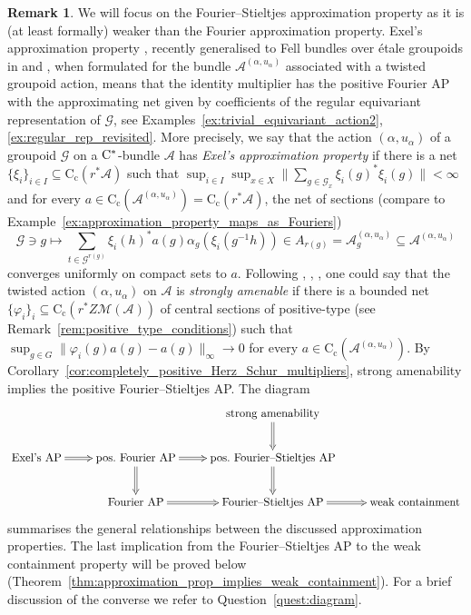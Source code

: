 \documentclass[11 pt, leqno]{amsart}
\numberwithin{equation}{section}
\theoremstyle{plain}
\theoremstyle{definition}
\newtheorem {rem} [thm]{Remark}
\newcommand*{\contc}{\mathrm{C_c}}%
\newcommand{\M}{\mathcal M}
\newcommand{\G}{\mathcal G} %
\newcommand{\A}{\mathcal A}
\newcommand{\cst}{\ifmmode\mathrm{C}^*\else{$\mathrm{C}^*$}\fi}
\begin{document}
\begin{rem} \label{rem:diagram}  
We will focus on the Fourier--Stieltjes approximation property as it is (at least formally) weaker than the Fourier approximation property. 
Exel's approximation property \cite[Definition~4.4]{Exel:amenability}, recently generalised to Fell bundles over \'etale groupoids in \cite[Definition~3.1]{Kranz} and \cite[Definition~4.10]{BussMartinez}, when formulated for the bundle $\A^{(\alpha,u_{\alpha})}$ associated with a twisted groupoid action, means that the identity multiplier has the positive Fourier AP with the approximating net given by  coefficients of the regular equivariant representation of $\G$, see Examples~\ref{ex:trivial_equivariant_action2}, \ref{ex:regular_rep_revisited}. 
More precisely, we say that the action $(\alpha,u_{\alpha})$ of a groupoid $\G$ on a $\cst$-bundle $\A$ has \emph{Exel's approximation property} if there is a net $\{\xi_{i}\}_{i\in I}\subseteq \contc(r^*\A)$ such that $\sup_{i\in I} \sup_{x\in X} \| \sum_{g\in \G_x}\xi_i(g)^*\xi_i(g) \| <\infty$ and for every $a\in\contc(\A^{(\alpha,u_{\alpha})})=\contc(r^*\A)$, the net of sections (compare to Example~\ref{ex:approximation_property_maps_as_Fouriers})
\[
    \G\ni g\longmapsto \sum_{t\in \G^{r(g)}} \xi_i(h)^* a(g)\alpha_{g}(\xi_i(g^{-1}h)) \in A_{r(g)} = \A^{(\alpha,u_{\alpha})}_g \subseteq \A^{(\alpha,u_{\alpha})}
\]
converges uniformly on compact sets to $a$. 
Following \cite[Definition 3.5]{BussEchterhoffWillett}, \cite[Definition 2.2]{Takeishi}, \cite[Theorem 5.6.18]{BO}, one could say that the twisted action $(\alpha,u_{\alpha})$ on $\A$ is \emph{strongly amenable} if there is a bounded net $\{\varphi_i\}_{i}\subseteq \contc(r^*Z\M(\A))$ of central sections of positive-type (see Remark~\ref{rem:positive_type_conditions}) such that $\sup_{g\in G} \|\varphi_i(g)a(g) - a(g)\|_{\infty}\longrightarrow 0$ for every $a \in \contc(\A^{(\alpha,u_{\alpha})})$. 
By Corollary~\ref{cor:completely_positive_Herz_Schur_multipliers}, strong amenability implies the  positive Fourier--Stieltjes AP.
The diagram 
\small
\[
    \xymatrix{
   &  & \text{strong amenability} \ar@{=>}[d]  & \\ 
    \text{Exel's AP} \ar@{=>}[r]  & \text{pos.\ Fourier AP} \ar@{=>}[r] \ar@{=>}[d]  & \text{pos.\ Fourier--Stieltjes AP}\ar@{=>}[d] & \\ 
    &  \text{Fourier AP} \ar@{=>}[r]  & \text{Fourier--Stieltjes AP} \ar@{=>}[r] & \text{weak containment} 
}
\] 
\normalsize
summarises the general relationships between the discussed approximation properties. 
The last implication from the Fourier--Stieltjes AP to the weak containment property will be proved below (Theorem~\ref{thm:approximation_prop_implies_weak_containment}). 
For a brief discussion of the converse we refer to Question~\ref{quest:diagram}.
\end{rem}
 
\end{document}
